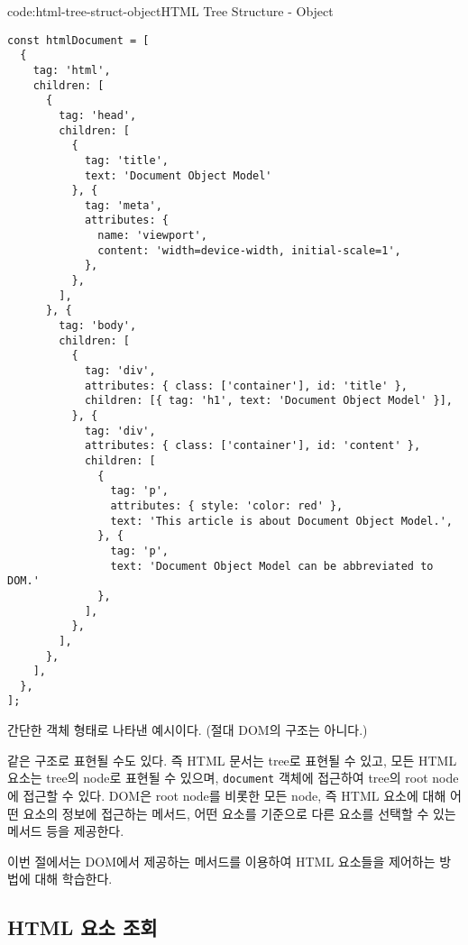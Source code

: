 \begin{codeenv}{code:html-tree-struct-object}{HTML Tree Structure - Object}\begin{verbatim}
const htmlDocument = [
  {
    tag: 'html',
    children: [
      {
        tag: 'head',
        children: [
          {
            tag: 'title',
            text: 'Document Object Model'
          }, {
            tag: 'meta',
            attributes: {
              name: 'viewport',
              content: 'width=device-width, initial-scale=1',
            },
          },
        ],
      }, {
        tag: 'body',
        children: [
          {
            tag: 'div',
            attributes: { class: ['container'], id: 'title' },
            children: [{ tag: 'h1', text: 'Document Object Model' }],
          }, {
            tag: 'div',
            attributes: { class: ['container'], id: 'content' },
            children: [
              {
                tag: 'p',
                attributes: { style: 'color: red' },
                text: 'This article is about Document Object Model.',
              }, {
                tag: 'p',
                text: 'Document Object Model can be abbreviated to DOM.'
              },
            ],
          },
        ],
      },
    ],
  },
];
\end{verbatim}
\end{codeenv}

\는 \을 간단한 객체 형태로 나타낸 예시이다. (절대 DOM의 구조는 아니다.)

    {}

\은 \와 같은 구조로 표현될 수도 있다. 즉 HTML 문서는 tree로 표현될 수 있고, 모든 HTML 요소는 tree의 node로 표현될 수 있으며, \texttt{document} 객체에 접근하여 tree의 root node에 접근할 수 있다. DOM은 root node를 비롯한 모든 node, 즉 HTML 요소에 대해 어떤 요소의 정보에 접근하는 메서드, 어떤 요소를 기준으로 다른 요소를 선택할 수 있는 메서드 등을 제공한다.

이번 절에서는 DOM에서 제공하는 메서드를 이용하여 HTML 요소들을 제어하는 방법에 대해 학습한다.

\subsection*{HTML 요소 조회}


